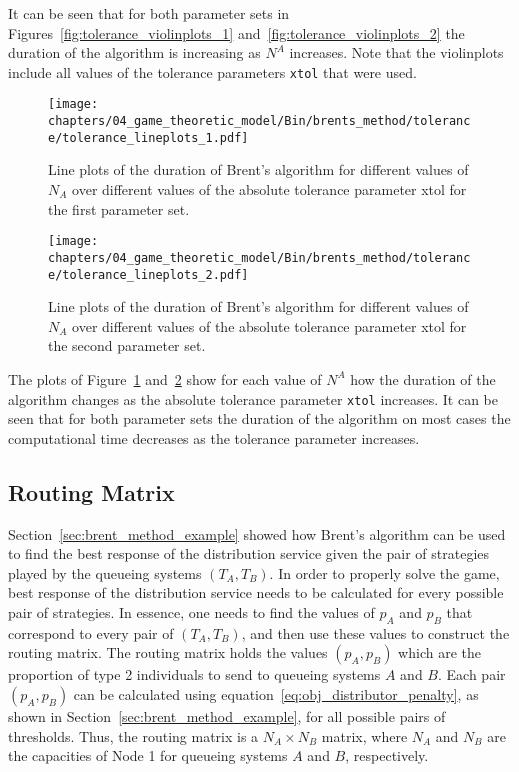 It can be seen that for both parameter sets in
Figures~\ref{fig:tolerance_violinplots_1} and~\ref{fig:tolerance_violinplots_2}
the duration of the algorithm is increasing as \(N^A\) increases.
Note that the violinplots include all values of the tolerance parameters
\texttt{xtol} that were used.

\begin{figure}[H]
    \centering
    \texttt{[image: chapters/04\_game\_theoretic\_model/Bin/brents\_method/tolerance/tolerance\_lineplots\_1.pdf]}
    \caption{
        Line plots of the duration of Brent's algorithm for different values of
        \(N_A\) over different values of the absolute tolerance parameter xtol
        for the first parameter set.
    }
    \label{fig:tolerance_lineplots_1}
\end{figure}

\begin{figure}[H]
    \centering
    \texttt{[image: chapters/04\_game\_theoretic\_model/Bin/brents\_method/tolerance/tolerance\_lineplots\_2.pdf]}
    \caption{
        Line plots of the duration of Brent's algorithm for different values of
        \(N_A\) over different values of the absolute tolerance parameter xtol
        for the second parameter set.
    }
    \label{fig:tolerance_lineplots_2}
\end{figure}

The plots of Figure~\ref{fig:tolerance_lineplots_1}
and~\ref{fig:tolerance_lineplots_2} show for each value of \(N^A\)
how the duration of the algorithm changes as the absolute tolerance parameter
\texttt{xtol} increases.
It can be seen that for both parameter sets the duration of the algorithm
on most cases the computational time decreases as the tolerance parameter
increases.



\subsection{Routing Matrix}\label{sec:routing_matrix}

Section~\ref{sec:brent_method_example} showed how Brent's algorithm can be used
to find the best response of the distribution service given the pair of
strategies played by the queueing systems \((T_A, T_B)\).
In order to properly solve the game, best response of the distribution service
needs to be calculated for every possible pair of strategies.
In essence, one needs to find the values of \(p_A\) and \(p_B\) that correspond
to every pair of \((T_A, T_B)\), and then use these values to construct the
routing matrix.
The routing matrix holds the values \((p_A, p_B)\) which are the proportion
of type 2 individuals to send to queueing systems \(A\) and \(B\).
Each pair \((p_A, p_B)\) can be calculated using
equation~\eqref{eq:obj_distributor_penalty}, as shown in
Section~\ref{sec:brent_method_example}, for all possible pairs of thresholds.
Thus, the routing matrix is a \(N_A \times N_B\) matrix, where \(N_A\) and
\(N_B\) are the capacities of Node 1 for queueing systems \(A\) and \(B\),
respectively.

